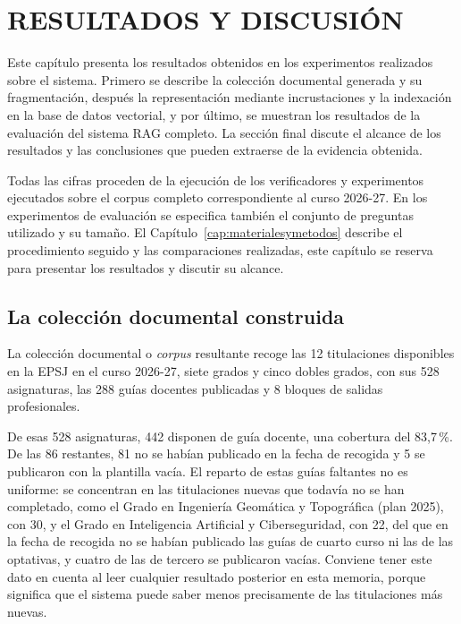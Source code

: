 \chapter[RESULTADOS Y DISCUSIÓN]{RESULTADOS Y DISCUSIÓN}
\label{cap:resultados}




Este capítulo presenta los resultados obtenidos en los experimentos realizados sobre el sistema. Primero se describe la colección documental generada y su fragmentación, después la representación mediante incrustaciones y la indexación en la base de datos vectorial, y por último, se muestran los resultados de la evaluación del sistema RAG completo. La sección final discute el alcance de los resultados y las conclusiones que pueden extraerse de la evidencia obtenida.

Todas las cifras proceden de la ejecución de los verificadores y experimentos ejecutados sobre el corpus completo correspondiente al curso 2026-27. En los experimentos de evaluación se especifica también el conjunto de preguntas utilizado y su tamaño. El Capítulo~\ref{cap:materialesymetodos} describe el procedimiento seguido y las comparaciones realizadas, este capítulo se reserva para presentar los resultados y discutir su alcance.

\section[La colección documental construida]{La colección documental construida} 
\label{secc:resultados_coleccion}

La colección documental o \textit{corpus} resultante recoge las 12 titulaciones disponibles en la EPSJ en el curso 2026-27, siete grados y cinco dobles grados, con sus 528 asignaturas, las 288 guías docentes publicadas y 8 bloques de salidas profesionales.

De esas 528 asignaturas, 442 disponen de guía docente, una cobertura del 83,7\,\%. De las 86 restantes, 81 no se habían publicado en la fecha de recogida y 5 se publicaron con la plantilla vacía. El reparto de estas guías faltantes no es uniforme: se concentran en las titulaciones nuevas que todavía no se han completado, como el Grado en Ingeniería Geomática y Topográfica (plan 2025), con 30, y el Grado en Inteligencia Artificial y Ciberseguridad, con 22, del que en la fecha de recogida no se habían publicado las guías de cuarto curso ni las de las optativas, y cuatro de las de tercero se publicaron vacías. Conviene tener este dato en cuenta al leer cualquier resultado posterior en esta memoria, porque significa que el sistema puede saber menos precisamente de las titulaciones más nuevas.

